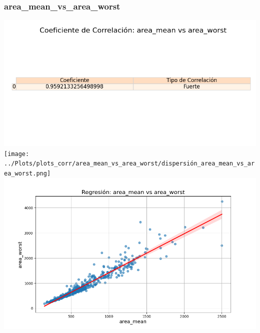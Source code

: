 \documentclass[a4paper, 12pt]{article}
\begin{document}
\subsubsection{area\_mean\_vs\_area\_worst}
	\includegraphics[width = \textwidth]{../Plots/plots_corr/area_mean_vs_area_worst/coeficiente_correlacion_area_mean_vs_area_worst.png}
	\texttt{[image: ../Plots/plots\_corr/area\_mean\_vs\_area\_worst/dispersión\_area\_mean\_vs\_area\_worst.png]}
	\includegraphics[width = \textwidth]{../Plots/plots_corr/area_mean_vs_area_worst/regresion_area_mean_vs_area_worst.png}
\end{document}
